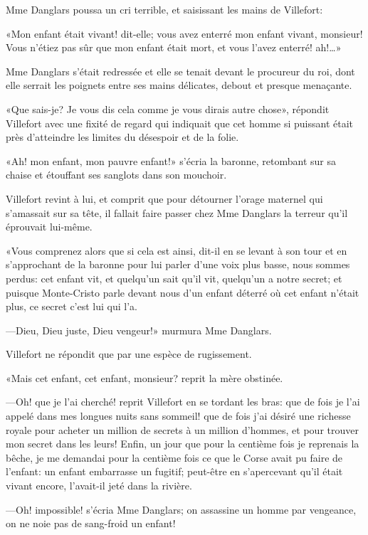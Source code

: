 Mme Danglars poussa un cri terrible, et saisissant les mains de Villefort: 

«Mon enfant était vivant! dit-elle; vous avez enterré mon enfant vivant, monsieur! Vous n'étiez pas sûr que mon enfant était mort, et vous l'avez enterré! ah!\dots» 

Mme Danglars s'était redressée et elle se tenait devant le procureur du roi, dont elle serrait les poignets entre ses mains délicates, debout et presque menaçante. 

«Que sais-je? Je vous dis cela comme je vous dirais autre chose», répondit Villefort avec une fixité de regard qui indiquait que cet homme si puissant était près d'atteindre les limites du désespoir et de la folie. 

«Ah! mon enfant, mon pauvre enfant!» s'écria la baronne, retombant sur sa chaise et étouffant ses sanglots dans son mouchoir. 

Villefort revint à lui, et comprit que pour détourner l'orage maternel qui s'amassait sur sa tête, il fallait faire passer chez Mme Danglars la terreur qu'il éprouvait lui-même. 

«Vous comprenez alors que si cela est ainsi, dit-il en se levant à son tour et en s'approchant de la baronne pour lui parler d'une voix plus basse, nous sommes perdus: cet enfant vit, et quelqu'un sait qu'il vit, quelqu'un a notre secret; et puisque Monte-Cristo parle devant nous d'un enfant déterré où cet enfant n'était plus, ce secret c'est lui qui l'a. 

—Dieu, Dieu juste, Dieu vengeur!» murmura Mme Danglars. 

Villefort ne répondit que par une espèce de rugissement. 

«Mais cet enfant, cet enfant, monsieur? reprit la mère obstinée. 

—Oh! que je l'ai cherché! reprit Villefort en se tordant les bras: que de fois je l'ai appelé dans mes longues nuits sans sommeil! que de fois j'ai désiré une richesse royale pour acheter un million de secrets à un million d'hommes, et pour trouver mon secret dans les leurs! Enfin, un jour que pour la centième fois je reprenais la bêche, je me demandai pour la centième fois ce que le Corse avait pu faire de l'enfant: un enfant embarrasse un fugitif; peut-être en s'apercevant qu'il était vivant encore, l'avait-il jeté dans la rivière. 

—Oh! impossible! s'écria Mme Danglars; on assassine un homme par vengeance, on ne noie pas de sang-froid un enfant! 

